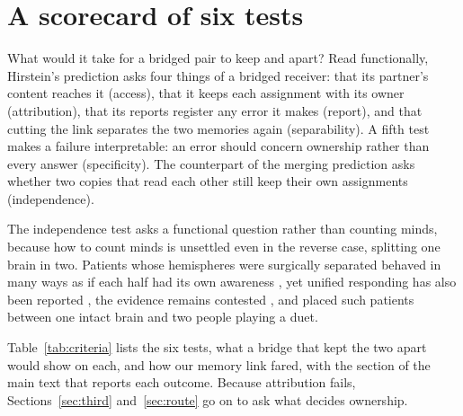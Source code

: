 \section{A scorecard of six tests}
\label{app:scorecard}

What would it take for a bridged pair to keep  and 
apart? Read functionally, Hirstein's prediction asks four things of a
bridged receiver: that its partner's content reaches it (access), that
it keeps each assignment with its owner (attribution), that its reports
register any error it makes (report), and that cutting the link
separates the two memories again (separability). A fifth test makes a
failure interpretable: an error should concern ownership rather than
every answer (specificity). The counterpart of the merging prediction
asks whether two copies that read each other still keep their own
assignments (independence).

The independence test asks a functional question rather than counting
minds, because how to count minds is unsettled even in the reverse
case, splitting one brain in two. Patients whose hemispheres were surgically separated behaved in
many ways as if each half had its own awareness
\citep{sperry1968hemisphere}, yet unified responding has also been
reported \citep{pinto2017splitbrain}, the evidence remains contested
\citep{dehaan2020splitbrain}, and \citet{nagel1971bisection} placed such
patients between one intact brain and two people playing a duet.

Table~\ref{tab:criteria} lists the six tests, what a bridge that kept
the two apart would show on each, and how our memory link fared, with
the section of the main text that reports each outcome. Because
attribution fails, Sections~\ref{sec:third} and~\ref{sec:route} go on
to ask what decides ownership.

